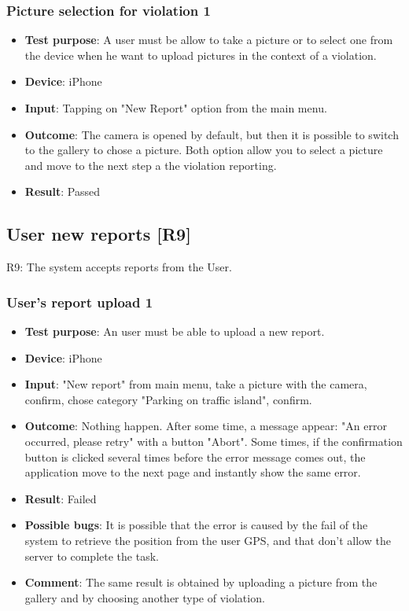 \documentclass[../ATD.tex]{subfiles}
\begin{document}
    \subsubsection{Picture selection for violation 1}\label{subsubsec:picture-selection-for-violation-1}
    \begin{itemize}
        \item \textbf{Test purpose}: A user must be allow to take a picture or to select one from the device when he want to upload pictures in the context of a violation.
        \item \textbf{Device}: iPhone
        \item \textbf{Input}: Tapping on "New Report" option from the main menu.
        \item \textbf{Outcome}: The camera is opened by default, but then it is possible to switch to the gallery to chose a picture.
        Both option allow you to select a picture and move to the next step a the violation reporting.
        \item \textbf{Result}: Passed
    \end{itemize}

    \subsection{User new reports [R9]}\label{subsec:user-new-report}
    R9: The system accepts reports from the User.

    \subsubsection{User's report upload 1}\label{subsubsec:user-report-upload-1}
    \begin{itemize}
        \item \textbf{Test purpose}: An user must be able to upload a new report.
        \item \textbf{Device}: iPhone
        \item \textbf{Input}: "New report" from main menu, take a picture with the camera, confirm, chose category "Parking on traffic island", confirm.
        \item \textbf{Outcome}: Nothing happen.
        After some time, a message appear: "An error occurred, please retry" with a button "Abort".
        Some times, if the confirmation button is clicked several times before the error message comes out, the application move to the next page and instantly show the same error.
        \item \textbf{Result}: Failed
        \item \textbf{Possible bugs}: It is possible that the error is caused by the fail of the system to retrieve the position from the user GPS, and that don't allow the server to complete the task.
        \item \textbf{Comment}: The same result is obtained by uploading a picture from the gallery and by choosing another type of violation.
    \end{itemize}
\end{document}
